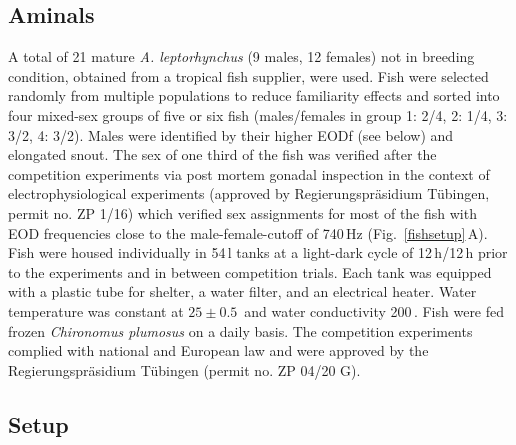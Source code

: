 \documentclass[vruler,JEB]{COB}%
\newcommand{\lepto}{\textit{A. leptorhynchus}}
\newcommand{\panel}[1]{\textsf{#1}}
\newcommand{\subfref}[2]{\textup{\ref{#1}}\,\panel{#2}}
\newcommand{\Figb}{Fig.}
\newcommand{\Subfigrefb}[2]{\Figb~\subfref{#1}{#2}}
\begin{document}
\subsection{Aminals}

A total of 21 mature \lepto{} (9 males, 12 females) not in breeding condition, obtained from a tropical fish supplier, were used. Fish were selected randomly from multiple populations to reduce familiarity effects and sorted into four mixed-sex groups of five or six fish (males/females in group 1: 2/4, 2: 1/4, 3: 3/2, 4: 3/2). Males were identified by their higher EODf (see below) and elongated snout. The sex of one third of the fish was verified after the competition experiments via post mortem gonadal inspection in the context of electrophysiological experiments (approved by Regierungspr\"asidium T\"ubingen, permit no. ZP 1/16) which verified sex assignments for most of the fish with EOD frequencies close to the male-female-cutoff of 740\,Hz (\Subfigrefb{fishsetup}{A}). Fish were housed individually in 54\,l tanks at a light-dark cycle of 12\,h/12\,h prior to the experiments and in between competition trials. Each tank was equipped with a plastic tube for shelter, a water filter, and an electrical heater. Water temperature was constant at $25\pm0.5$\,\celsius{} and water conductivity 200\,\micro\siemens\per\centi\meter. Fish were fed frozen \textit{Chironomus plumosus} on a daily basis. The competition experiments complied with national and European law and were approved by the Regierungspr\"asidium T\"ubingen (permit no. ZP 04/20 G). 

\subsection{Setup}
\end{document}
